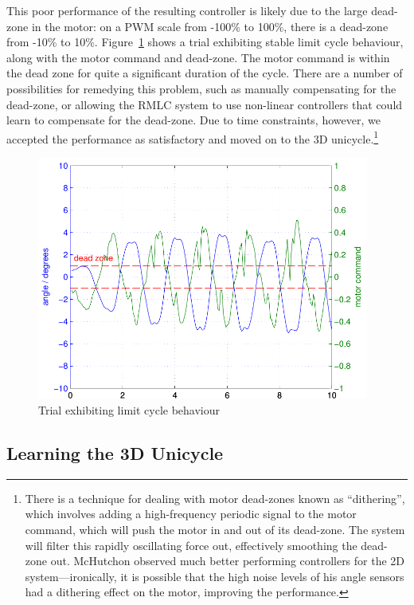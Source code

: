 \documentclass{IIBproject}
\begin{document}
This poor performance of the resulting controller is likely due to the large
dead-zone in the motor: on a PWM scale from -100\% to 100\%, there is a
dead-zone from -10\% to 10\%. Figure~\ref{fig:limit_cycle} shows a trial
exhibiting stable limit cycle behaviour, along with the motor command and
dead-zone. The motor command is within the dead zone for quite a significant
duration of the cycle. There are a number of possibilities for remedying this
problem, such as manually compensating for the dead-zone, or allowing the RMLC
system to use non-linear controllers that could learn to compensate for the
dead-zone. Due to time constraints, however, we accepted the performance as
satisfactory and moved on to the 3D unicycle.\footnote{There is a technique
for dealing with motor dead-zones known as ``dithering'', which involves
adding a high-frequency periodic signal to the motor command, which will push
the motor in and out of its dead-zone. The system will filter this rapidly
oscillating force out, effectively smoothing the dead-zone out. McHutchon
observed much better performing controllers for the 2D system---ironically, it
is possible that the high noise levels of his angle sensors had a dithering
effect on the motor, improving the performance.}

\begin{figure}[htpb]
  \begin{center}
    \includegraphics[height=8cm]{2d_limit_cycle.pdf}
    \end{center}
    \caption{Trial exhibiting limit cycle behaviour}
    \label{fig:limit_cycle}
    \end{figure}

\subsection{Learning the 3D Unicycle}
\end{document}
